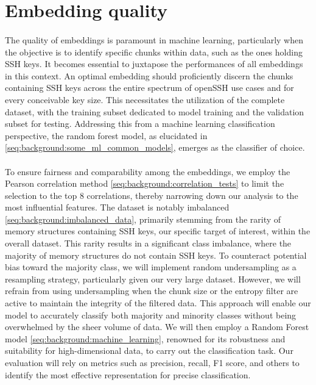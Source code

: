 \section{Embedding quality}\label{chap:embedding_quality}
\paragraph{}The quality of embeddings is paramount in machine learning, particularly when the objective is to identify specific \glspl{chunk} within data, such as the ones holding SSH keys. It becomes essential to juxtapose the performances of all embeddings in this context. An optimal embedding should proficiently discern the \glspl{chunk} containing SSH keys across the entire spectrum of openSSH use cases and for every conceivable key size. This necessitates the utilization of the complete dataset, with the training subset dedicated to model training and the validation subset for testing. Addressing this from a machine learning classification perspective, the random forest model, as elucidated in \ref{seq:background:some_ml_common_models}, emerges as the classifier of choice.

\paragraph{}To ensure fairness and comparability among the embeddings, we employ the Pearson correlation method \ref{seq:background:correlation_tests} to limit the selection to the top 8 correlations, thereby narrowing down our analysis to the most influential features. The dataset is notably imbalanced \ref{seq:background:imbalanced_data}, primarily stemming from the rarity of memory structures containing SSH keys, our specific target of interest, within the overall dataset. This rarity results in a significant class imbalance, where the majority of memory structures do not contain SSH keys. To counteract potential bias toward the majority class, we will implement random undersampling as a resampling strategy, particularly given our very large dataset. However, we will refrain from using undersampling when the chunk size or the entropy filter are active to maintain the integrity of the filtered data. This approach will enable our model to accurately classify both majority and minority classes without being overwhelmed by the sheer volume of data. We will then employ a Random Forest model \ref{seq:background:machine_learning}, renowned for its robustness and suitability for high-dimensional data, to carry out the classification task. Our evaluation will rely on metrics such as precision, recall, F1 score, and others to identify the most effective representation for precise classification.

